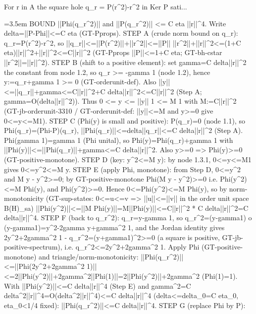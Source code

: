\documentclass{article}
\newcommand{\step}[1]{\par\noindent\hangindent=3.5em\hangafter=1%
  \makebox[3.5em][l]{\textbf{#1.}}}
\begin{document}
\begin{proofbox}{For r in A the square hole q\_r = P(r\textasciicircum{}2)-r\textasciicircum{}2 in Ker P sati...}
\step{1.3} BOUND ||Phi(q\_r\textasciicircum{}2)|| and ||P(q\_r\textasciicircum{}2)|| <= C eta ||r||\textasciicircum{}4. Write delta=||P-Phi||<=C eta (GT-Pprops). STEP A (crude norm bound on q\_r): q\_r=P(r\textasciicircum{}2)-r\textasciicircum{}2, so ||q\_r||<=||P(r\textasciicircum{}2)||+||r\textasciicircum{}2||<=||P|| ||r\textasciicircum{}2||+||r||\textasciicircum{}2<=(1+C eta)||r||\textasciicircum{}2+||r||\textasciicircum{}2<=C||r||\textasciicircum{}2 (GT-Pprops ||P||<=1+C eta; GT-bh-cstar ||r\textasciicircum{}2||=||r||\textasciicircum{}2). STEP B (shift to a positive element): set gamma=C delta||r||\textasciicircum{}2 the constant from node 1.2, so q\_r >= -gamma 1 (node 1.2), hence y:=q\_r+gamma 1 >= 0 (GT-orderunit-def). Also ||y||<=||q\_r||+gamma<=C||r||\textasciicircum{}2+C delta||r||\textasciicircum{}2<=C||r||\textasciicircum{}2 (Step A; gamma=O(delta||r||\textasciicircum{}2)). Thus 0 <= y <= ||y|| 1 <= M 1 with M:=C||r||\textasciicircum{}2 (GT-jb-orderunit-3310 / GT-orderunit-def: ||y||<=M and y>=0 give 0<=y<=M1). STEP C (Phi(y) is small and positive): P(q\_r)=0 (node 1.1), so Phi(q\_r)=(Phi-P)(q\_r), ||Phi(q\_r)||<=delta||q\_r||<=C delta||r||\textasciicircum{}2 (Step A). Phi(gamma 1)=gamma 1 (Phi unital), so Phi(y)=Phi(q\_r)+gamma 1 with ||Phi(y)||<=||Phi(q\_r)||+gamma<=C delta||r||\textasciicircum{}2. Also y>=0 => Phi(y)>=0 (GT-positive-monotone). STEP D (key: y\textasciicircum{}2<=M y): by node 1.3.1, 0<=y<=M1 gives 0<=y\textasciicircum{}2<=M y. STEP E (apply Phi, monotone): from Step D, 0<=y\textasciicircum{}2 and M y - y\textasciicircum{}2>=0; by GT-positive-monotone Phi(M y - y\textasciicircum{}2)>=0 i.e. Phi(y\textasciicircum{}2)<=M Phi(y), and Phi(y\textasciicircum{}2)>=0. Hence 0<=Phi(y\textasciicircum{}2)<=M Phi(y), so by norm-monotonicity (GT-sup-states: 0<=u<=v => ||u||<=||v|| in the order unit space B(H)\_sa) ||Phi(y\textasciicircum{}2)||<=||M Phi(y)||=M||Phi(y)||<=C||r||\textasciicircum{}2 * C delta||r||\textasciicircum{}2=C delta||r||\textasciicircum{}4. STEP F (back to q\_r\textasciicircum{}2): q\_r=y-gamma 1, so q\_r\textasciicircum{}2=(y-gamma1) o (y-gamma1)=y\textasciicircum{}2-2gamma y+gamma\textasciicircum{}2 1, and the Jordan identity gives 2y\textasciicircum{}2+2gamma\textasciicircum{}2 1 - q\_r\textasciicircum{}2=(y+gamma1)\textasciicircum{}2>=0 (a square is positive, GT-jb-positive-spectrum), i.e. q\_r\textasciicircum{}2<=2y\textasciicircum{}2+2gamma\textasciicircum{}2 1. Apply Phi (GT-positive-monotone) and triangle/norm-monotonicity: ||Phi(q\_r\textasciicircum{}2)||<=||Phi(2y\textasciicircum{}2+2gamma\textasciicircum{}2 1)||<=2||Phi(y\textasciicircum{}2)||+2gamma\textasciicircum{}2||Phi(1)||=2||Phi(y\textasciicircum{}2)||+2gamma\textasciicircum{}2 (Phi(1)=1). With ||Phi(y\textasciicircum{}2)||<=C delta||r||\textasciicircum{}4 (Step E) and gamma\textasciicircum{}2=C delta\textasciicircum{}2||r||\textasciicircum{}4=O(delta\textasciicircum{}2||r||\textasciicircum{}4)<=C delta||r||\textasciicircum{}4 (delta<=delta\_0=C eta\_0, eta\_0<1/4 fixed): ||Phi(q\_r\textasciicircum{}2)||<=C delta||r||\textasciicircum{}4. STEP G (replace Phi by P): 
\end{proofbox}
\end{document}
